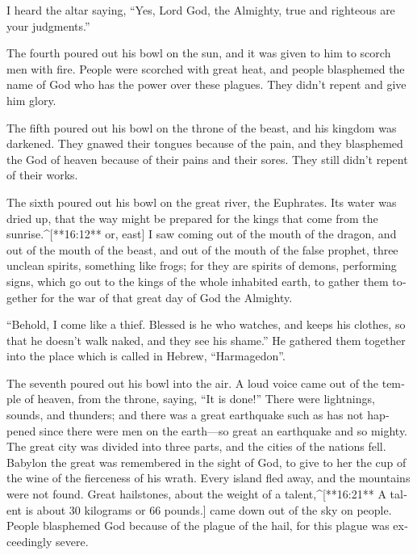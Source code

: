 \begin{paracols}{2}
\begin{english}
 I heard the altar saying, “Yes, Lord God, the Almighty, true and righteous are your judgments.” 

 The fourth poured out his bowl on the sun, and it was given to him to scorch men with fire.  People were scorched with great heat, and people blasphemed the name of God who has the power over these plagues. They didn’t repent and give him glory. 

 The fifth poured out his bowl on the throne of the beast, and his kingdom was darkened. They gnawed their tongues because of the pain,  and they blasphemed the God of heaven because of their pains and their sores. They still didn’t repent of their works. 

 The sixth poured out his bowl on the great river, the Euphrates. Its water was dried up, that the way might be prepared for the kings that come from the sunrise.^[**16:12** or, east]  I saw coming out of the mouth of the dragon, and out of the mouth of the beast, and out of the mouth of the false prophet, three unclean spirits, something like frogs;  for they are spirits of demons, performing signs, which go out to the kings of the whole inhabited earth, to gather them together for the war of that great day of God the Almighty. 

 “Behold, I come like a thief. Blessed is he who watches, and keeps his clothes, so that he doesn’t walk naked, and they see his shame.”  He gathered them together into the place which is called in Hebrew, “Harmagedon”. 

 The seventh poured out his bowl into the air. A loud voice came out of the temple of heaven, from the throne, saying, “It is done!”  There were lightnings, sounds, and thunders; and there was a great earthquake such as has not happened since there were men on the earth—so great an earthquake and so mighty.  The great city was divided into three parts, and the cities of the nations fell. Babylon the great was remembered in the sight of God, to give to her the cup of the wine of the fierceness of his wrath.  Every island fled away, and the mountains were not found.  Great hailstones, about the weight of a talent,^[**16:21** A talent is about 30 kilograms or 66 pounds.] came down out of the sky on people. People blasphemed God because of the plague of the hail, for this plague was exceedingly severe.


\end{english}
\end{paracols}
